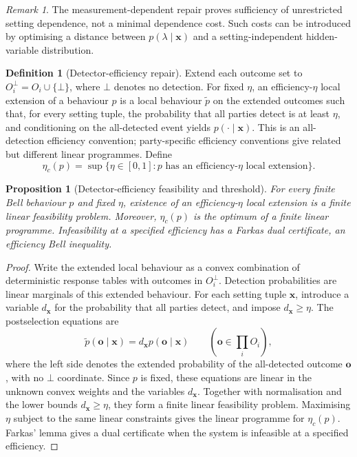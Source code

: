 \documentclass[11pt]{article}
\theoremstyle{plain}
\newtheorem{proposition}[theorem]{Proposition}
\theoremstyle{definition}
\newtheorem{definition}[theorem]{Definition}
\theoremstyle{remark}
\newtheorem{remark}[theorem]{Remark}
\begin{document}
\begin{remark}
The measurement-dependent repair proves sufficiency of unrestricted setting
dependence, not a minimal dependence cost. Such costs can be introduced by
optimising a distance between \(p(\lambda\mid\mathbf x)\) and a
setting-independent hidden-variable distribution.
\end{remark}

\begin{definition}[Detector-efficiency repair]
\label{def:detection-repair}
Extend each outcome set to \(O_i^\bot=O_i\cup\{\bot\}\), where \(\bot\) denotes
no detection. For fixed \(\eta\), an efficiency-\(\eta\) local extension of a
behaviour \(p\) is a local behaviour \(\widetilde p\) on the extended outcomes
such that, for every setting tuple, the probability that all parties detect is
at least \(\eta\), and conditioning on the all-detected event yields
\(p(\cdot\mid\mathbf x)\). This is an all-detection efficiency convention;
party-specific efficiency conventions give related but different linear
programmes. Define
\[
\eta_c(p)=\sup\{\eta\in[0,1]:p\text{ has an efficiency-}\eta
\text{ local extension}\}.
\]
\end{definition}

\begin{proposition}[Detector-efficiency feasibility and threshold]
\label{prop:detector-certificate}
For every finite Bell behaviour \(p\) and fixed \(\eta\), existence of an
efficiency-\(\eta\) local extension is a finite linear feasibility problem.
Moreover, \(\eta_c(p)\) is the optimum of a finite linear programme. Infeasibility
at a specified efficiency has a Farkas dual certificate, an efficiency Bell
inequality.
\end{proposition}

\begin{proof}
Write the extended local behaviour as a convex combination of deterministic
response tables with outcomes in \(O_i^\bot\). Detection probabilities are linear
marginals of this extended behaviour. For each setting tuple \(\mathbf x\),
introduce a variable \(d_{\mathbf x}\) for the probability that all parties
detect, and impose \(d_{\mathbf x}\ge\eta\). The postselection equations are
\[
\widetilde p(\mathbf o\mid\mathbf x)
=d_{\mathbf x}p(\mathbf o\mid\mathbf x)
\qquad(\mathbf o\in\prod_iO_i),
\]
where the left side denotes the extended probability of the all-detected outcome
\(\mathbf o\), with no \(\bot\) coordinate. Since \(p\) is fixed, these equations
are linear in the unknown convex weights and the variables \(d_{\mathbf x}\).
Together with normalisation and the lower bounds \(d_{\mathbf x}\ge\eta\), they
form a finite linear feasibility problem. Maximising \(\eta\) subject to the same
linear constraints gives the linear programme for \(\eta_c(p)\). Farkas' lemma
gives a dual certificate when the system is infeasible at a specified efficiency.
\end{proof}
\end{document}
